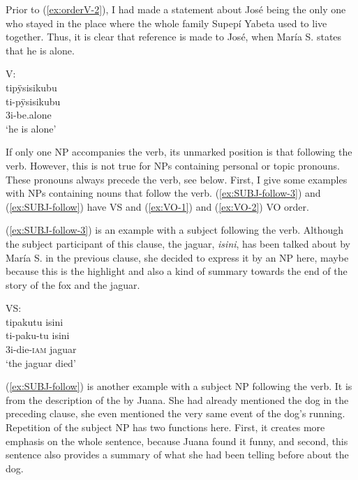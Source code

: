 Prior to (\ref{ex:orderV-2}), I had made a statement about José being the only one who stayed in the place where the whole family Supepí Yabeta used to live together. Thus, it is clear that reference is made to José, when María S. states that he is alone.

\ea\label{ex:orderV-2}
\begingl
\glpreamble \textup{V:}\\ tipÿsisikubu\\
\gla ti-pÿsisikubu\\
\glb 3i-be.alone\\
\glft ‘he is alone’
\endgl
\trailingcitation{[rxx-e120511l.187]}
\xe

If only one NP accompanies the verb, its unmarked position is that following the verb. However, this is not true for NPs containing personal or topic pronouns. These pronouns always precede the verb, see below. First, I give some examples with NPs containing nouns that follow the verb. (\ref{ex:SUBJ-follow-3}) and (\ref{ex:SUBJ-follow}) have VS and (\ref{ex:VO-1}) and (\ref{ex:VO-2}) VO order.

(\ref{ex:SUBJ-follow-3}) is an example with a subject following the verb. Although the subject participant of this clause, the jaguar, \textit{isini}, has been talked about by María S. in the previous clause, she decided to express it by an NP here, maybe because this is the highlight and also a kind of summary towards the end of the story of the fox and the jaguar.

\ea\label{ex:SUBJ-follow-3}
\begingl 
\glpreamble \textup{VS:}\\tipakutu isini\\
\gla ti-paku-tu isini\\ 
\glb 3i-die-\textsc{iam} jaguar\\
\glft ‘the jaguar died’\\ 
\endgl
\trailingcitation{[rxx-n120511l-1.040]}
\xe

(\ref{ex:SUBJ-follow}) is another example with a subject NP following the verb. It is from the description of the  by Juana. She had already mentioned the dog in the preceding clause, she even mentioned the very same event of the dog’s running. Repetition of the subject NP has two functions here. First, it creates more emphasis on the whole sentence, because Juana found it funny, and second, this sentence also provides a summary of what she had been telling before about the dog.

